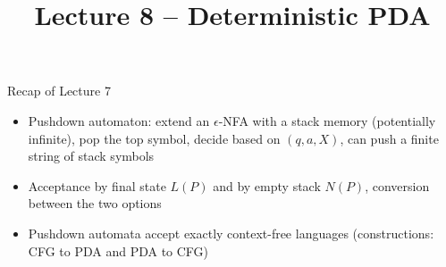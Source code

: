 \documentclass[handout]{beamer}
\title{Lecture 8 -- Deterministic PDA}
\begin{document}
\frame{\titlepage}


\begin{frame}{Recap of Lecture 7}
	
    \begin{itemize}        
		\item Pushdown automaton: extend an $\epsilon$-NFA with a stack memory (potentially infinite), pop the top symbol, decide based on $(q,a,X)$, can push a finite string of stack symbols
        \item Acceptance by final state $L(P)$ and by empty stack $N(P)$, conversion between the two options
        \item Pushdown automata accept exactly context-free languages (constructions: CFG to PDA and PDA to CFG)		
	\end{itemize}

\end{frame}
\end{document}
